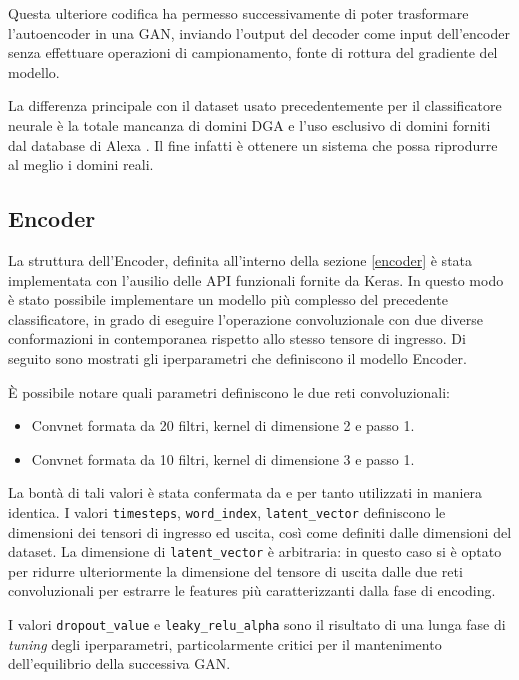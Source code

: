 Questa ulteriore codifica ha permesso successivamente di poter trasformare l'autoencoder in una GAN, inviando l'output del decoder come input dell'encoder senza effettuare operazioni di campionamento, fonte di rottura del gradiente del modello.

La differenza principale con il dataset usato precedentemente per il classificatore neurale è la totale mancanza di domini DGA e l'uso esclusivo di domini forniti dal database di Alexa \cite{amazon:alexa}. Il fine infatti è ottenere un sistema che possa riprodurre al meglio i domini reali.


\subsection{Encoder}
\label{imp:autoe:enc}
La struttura dell'Encoder, definita all'interno della sezione \ref{encoder} è stata implementata con l'ausilio delle API funzionali fornite da Keras. In questo modo è stato possibile implementare un modello più complesso del precedente classificatore, in grado di eseguire l'operazione convoluzionale con due diverse conformazioni in contemporanea rispetto allo stesso tensore di ingresso. Di seguito sono mostrati gli iperparametri che definiscono il modello Encoder. 



\`E possibile notare quali parametri definiscono le due reti convoluzionali:
\begin{itemize}
\item Convnet formata da 20 filtri, kernel di dimensione 2 e passo 1.
\item Convnet formata da 10 filtri, kernel di dimensione 3 e passo 1.
\end{itemize}

La bontà di tali valori è stata confermata da \cite{deepdga} e per tanto utilizzati in maniera identica.
I valori \lstinline!timesteps!, \lstinline!word_index!, \lstinline!latent_vector! definiscono le dimensioni dei tensori di ingresso ed uscita, così come definiti dalle dimensioni del dataset. La dimensione di \lstinline!latent_vector! è arbitraria: in questo caso si è optato per  ridurre ulteriormente la dimensione del tensore di uscita dalle due reti convoluzionali per estrarre le features più caratterizzanti dalla fase di encoding.

I valori \lstinline!dropout_value! e \lstinline!leaky_relu_alpha! sono il risultato di una lunga fase di \textit{tuning} degli iperparametri, particolarmente critici per il mantenimento dell'equilibrio della successiva GAN.

